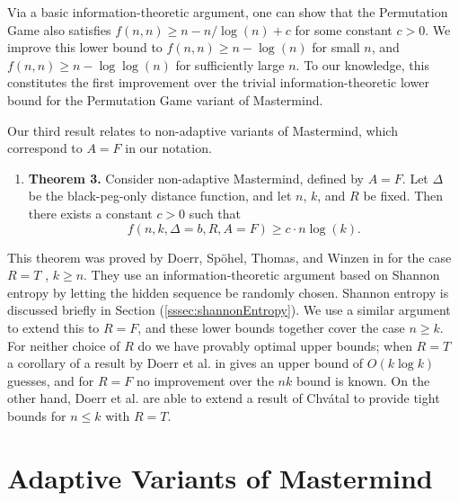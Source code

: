 \documentclass[12pt, a4paper]{article}
\begin{document}
Via a basic information-theoretic argument, one can show that the Permutation Game also satisfies $f(n, n)\ge n - n/\log(n) + c$ for some constant $c>0$. We improve this lower bound to $f(n, n)\ge n - \log(n)$ for small $n$, and $f(n, n)\ge n- \log \log(n)$ for sufficiently large $n$. To our knowledge, this constitutes the first improvement over the trivial information-theoretic lower bound for the Permutation Game variant of Mastermind.

Our third result relates to non-adaptive variants of Mastermind, which correspond to $A=F$ in our notation.
\begin{enumerate}[label=]
	\item\textbf{Theorem 3.} Consider non-adaptive Mastermind, defined by $A=F$. Let $\Delta$ be the black-peg-only distance function, and let $n$, $k$, and $R$ be fixed. Then there exists a constant $c>0$ such that
	\begin{equation*}
		f(n, k, \Delta = b, R, A=F)\ge c\cdot n\log(k).
	\end{equation*}
\end{enumerate}
This theorem was proved by Doerr, Sp\"ohel, Thomas, and Winzen in \cite{DS13} for the case $R = T$ , $k \ge n$. They use an information-theoretic argument based on Shannon entropy by letting the hidden sequence be randomly chosen. Shannon entropy is discussed briefly in Section (\ref{sssec:shannonEntropy}).
We use a similar argument to extend this to $R = F$, and
these lower bounds together cover the case $n \geq k$. For neither choice of $R$ do we have provably optimal upper bounds; when $R = T$ a corollary of a result by Doerr et al. in \cite{DS13} gives an upper bound of $O(k \log k)$ guesses, and for $R = F$ no improvement over the $nk$ bound is known. On the other hand, Doerr et al. are able to extend a result of Chv\'atal \cite{VC83} to provide tight bounds for $n \le k$ with $R = T$.

\section{Adaptive Variants of Mastermind}
\end{document}
